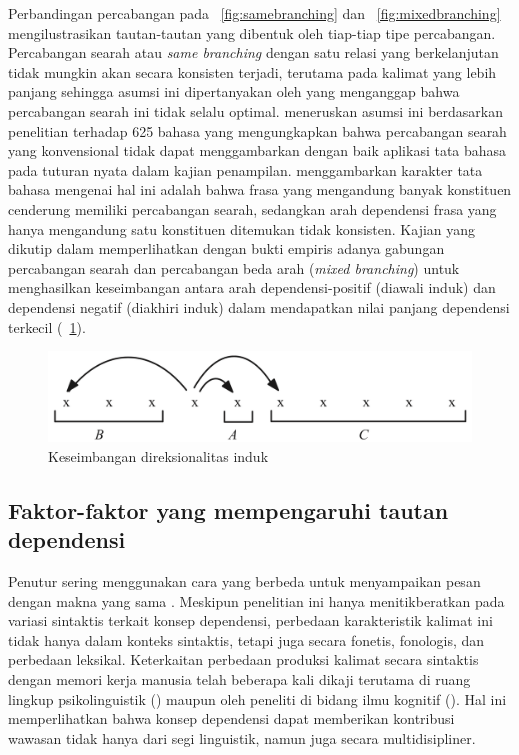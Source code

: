 Perbandingan percabangan pada \pic~\ref{fig:samebranching} dan \pic~\ref{fig:mixedbranching} mengilustrasikan tautan-tautan yang dibentuk oleh tiap-tiap tipe percabangan. Percabangan searah atau \textit{same branching} dengan satu relasi yang berkelanjutan tidak mungkin akan secara konsisten terjadi, terutama pada kalimat yang lebih panjang sehingga asumsi ini dipertanyakan oleh \cite{temperley2008dependency} yang menganggap bahwa percabangan searah ini tidak selalu optimal. \cite{temperley2008dependency} meneruskan asumsi ini berdasarkan penelitian \cite{dryer1992greenbergian} terhadap 625 bahasa yang mengungkapkan bahwa percabangan searah yang konvensional tidak dapat menggambarkan dengan baik aplikasi tata bahasa pada tuturan nyata dalam kajian penampilan. \cite{dryer1992greenbergian} menggambarkan karakter tata bahasa mengenai hal ini adalah bahwa frasa yang mengandung banyak konstituen cenderung memiliki percabangan searah, sedangkan arah dependensi frasa yang hanya mengandung satu konstituen ditemukan tidak konsisten. Kajian \cite{dryer1992greenbergian} yang dikutip dalam \cite{gildea2010grammars} memperlihatkan dengan bukti empiris adanya gabungan percabangan searah dan percabangan beda arah (\textit{mixed branching}) untuk menghasilkan keseimbangan antara arah dependensi-positif (diawali induk) dan dependensi negatif (diakhiri induk) dalam mendapatkan nilai panjang dependensi terkecil (\pic~\ref{fig:balancedbranching}).

\begin{figure}
	\centering \includegraphics[width=0.8
	\textwidth] {pics/balancedbranching.png} \caption{Keseimbangan direksionalitas induk} 
\label{fig:balancedbranching} \end{figure}

\subsection{Faktor-faktor yang mempengaruhi tautan dependensi}
Penutur sering menggunakan cara yang berbeda untuk menyampaikan pesan dengan makna yang sama \citep{kroch2001syntactic}. Meskipun penelitian ini hanya menitikberatkan pada variasi sintaktis terkait konsep dependensi, perbedaan karakteristik kalimat ini tidak hanya dalam konteks sintaktis, tetapi juga secara fonetis, fonologis, dan perbedaan leksikal. Keterkaitan perbedaan produksi kalimat secara sintaktis dengan memori kerja manusia telah beberapa kali dikaji terutama di ruang lingkup psikolinguistik (\citealp{jay2003psychology, levy2013surprisal}) maupun oleh peneliti di bidang ilmu kognitif (\citealp{futrell2015large, christiansen2016now, liu2017dependency}). Hal ini memperlihatkan bahwa konsep dependensi dapat memberikan kontribusi wawasan tidak hanya dari segi linguistik, namun juga secara multidisipliner.

